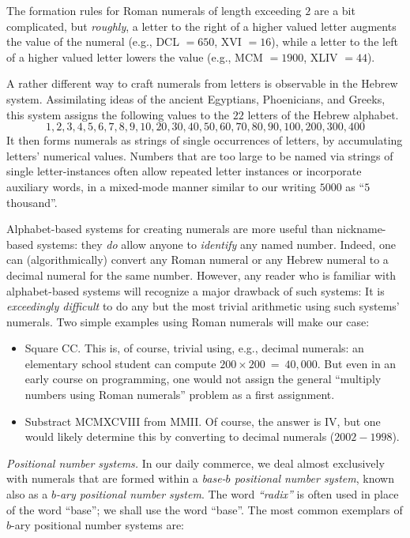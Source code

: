 \noindent
The formation rules for Roman numerals of length exceeding $2$ are a
bit complicated, but {\em roughly}, a letter to the right of a higher
valued letter augments the value of the numeral (e.g., DCL $=650$, XVI
$=16$), while a letter to the left of a higher valued letter lowers
the value (e.g., MCM $=1900$, XLIV $=44$).

A rather different way to craft numerals from letters is observable in
the Hebrew system.  Assimilating ideas of the
ancient Egyptians, Phoenicians, and Greeks, this system assigns the
following values to the $22$ letters of the Hebrew alphabet.
\[ 1, 2, 3, 4, 5, 6, 7, 8, 9, 10,
20, 30, 40, 50, 60, 70, 80, 90, 100,
 200, 300, 400
\]
It then forms numerals as strings of single occurrences of letters, by
accumulating letters' numerical values.  Numbers that are too large to
be named via strings of single letter-instances often allow repeated
letter instances or incorporate auxiliary words, in a mixed-mode
manner similar to our writing $5000$ as ``$5$ thousand''.

\medskip

Alphabet-based systems for creating numerals are more useful than
nickname-based systems: they {\em do} allow anyone to {\em identify}
any named number. Indeed, one can (algorithmically) convert any Roman
numeral or any Hebrew numeral to a decimal numeral for the same
number.  However, any reader who is familiar with alphabet-based
systems will recognize a major drawback of such systems: It is {\em
  exceedingly difficult} to do any but the most trivial arithmetic
using such systems' numerals.  Two simple examples using Roman
numerals will make our case:
\begin{itemize}
\item
Square CC.  This is, of course, trivial using, e.g., decimal numerals:
an elementary school student can compute $200 \times 200 \ =
\ 40,000$.  But even in an early course on programming, one would not
assign the general ``multiply numbers using Roman numerals'' problem
as a first assignment.

\item
Substract MCMXCVIII from MMII.  Of course, the answer is IV, but one
would likely determine this by converting to decimal numerals
($2002-1998$).
\end{itemize}

\noindent
{\it Positional number systems.}
%
In our daily commerce, we deal almost exclusively with numerals that
are formed within a {\it base-$b$ positional number system},
 known also as
a {\it $b$-ary positional number system}.
The word {\it ``radix''} is often used in place of the word ``base'';
we shall use the word ``base''.  The most common exemplars of $b$-ary
positional number systems are:


